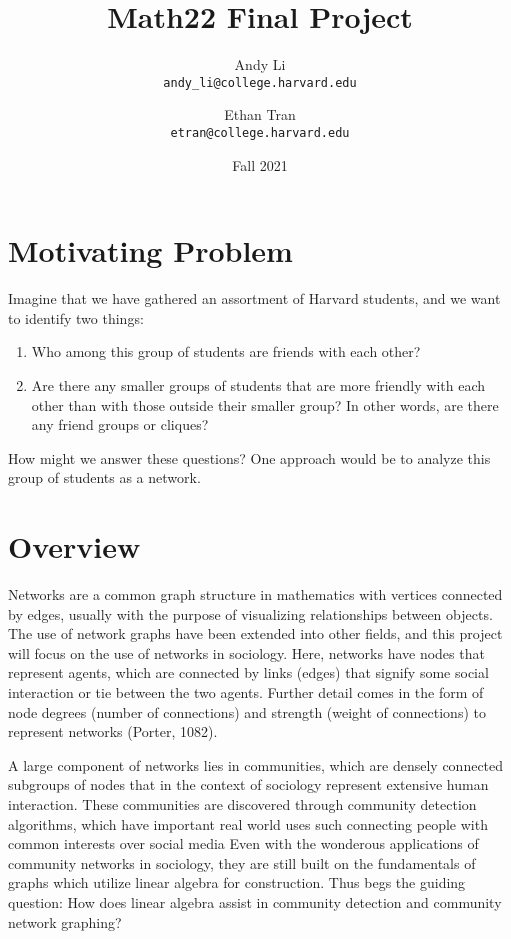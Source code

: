 \documentclass{article}
\title{Math22 Final Project}
\date{Fall 2021}
\author{Andy Li\\ \texttt{andy\_li@college.harvard.edu} \and Ethan Tran\\ \texttt{etran@college.harvard.edu}}
\begin{document}
\maketitle

\pagebreak

\tableofcontents

\section{Motivating Problem}
Imagine that we have gathered an assortment of Harvard students, and we want to identify two things: 
\bigskip
\begin{enumerate}
  \item Who among this group of students are friends with each other?
  \item Are there any smaller groups of students that are more friendly with each other than with those outside their smaller group? 
        In other words, are there any friend groups or cliques?
\end{enumerate}
\bigskip

How might we answer these questions? One approach would be to analyze this group of students as a network.

\section{Overview}
Networks are a common graph structure in mathematics with vertices connected by edges, usually with the purpose of visualizing relationships between objects.
The use of network graphs have been extended into other fields, and this project will focus on the use of networks in sociology.
Here, networks have nodes that represent agents, which are connected by links (edges) that signify some social interaction or tie between the two agents.
Further detail comes in the form of node degrees (number of connections) and strength (weight of connections) to represent networks (Porter, 1082). 
 
A large component of networks lies in communities, which are densely connected subgroups of nodes that in the context of sociology represent extensive human interaction.
These communities are discovered through community detection algorithms, which have important real world uses such connecting people with common interests over social media
Even with the wonderous applications of community networks in sociology, they are still built on the fundamentals of graphs which utilize linear algebra for construction. 
Thus begs the guiding question:
How does linear algebra assist in community detection and community network graphing?
\end{document}
